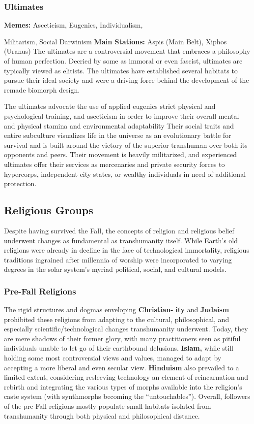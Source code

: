 \subsubsection{Ultimates}

\textbf{Memes:} Asceticism, Eugenics, Individualism, 

Militarism, Social Darwinism
\textbf{Main Stations:} Aspis (Main Belt), Xiphos (Uranus)
The ultimates are a controversial movement that 
embraces a philosophy of human perfection. Decried 
by some as immoral or even fascist, ultimates are typically
viewed as elitists. The ultimates have established
several habitats to pursue their ideal society and were 
a driving force behind the development of the remade 
biomorph design.

The ultimates advocate the use of applied eugenics
strict physical and psychological training, and
asceticism in order to improve their overall mental 
and physical stamina and environmental adaptability
Their social traits and entire subculture visualizes
life in the universe as an evolutionary battle
for survival and is built around the victory of the 
superior transhuman over both its opponents and 
peers. Their movement is heavily militarized, and 
experienced ultimates offer their services as mercenaries
and private security forces to hypercorps,
independent city states, or wealthy individuals in 
need of additional protection.

\subsection{Religious Groups}

Despite having survived the Fall, the concepts of 
religion and religious belief underwent changes as 
fundamental as transhumanity itself. While Earth's old 
religions were already in decline in the face of technological
immortality, religious traditions ingrained after
millennia of worship were incorporated to varying 
degrees in the solar system's myriad political, social, 
and cultural models.

\subsubsection{Pre-Fall Religions}

The rigid structures and dogmas enveloping \textbf{Christian-}
\textbf{ity} and \textbf{Judaism} prohibited these religions from adapting
to the cultural, philosophical, and especially scientific/technological
changes transhumanity underwent.
Today, they are mere shadows of their former glory, 
with many practitioners seen as pitiful individuals 
unable to let go of their earthbound delusions. \textbf{Islam,}
while still holding some most controversial views and 
values, managed to adapt by accepting a more liberal 
and even secular view. \textbf{Hinduism} also prevailed to a 
limited extent, considering resleeving technology an 
element of reincarnation and rebirth and integrating 
the various types of morphs available into the religion's
caste system (with synthmorphs becoming the
``untouchables''). Overall, followers of the pre-Fall 
religions mostly populate small habitats isolated from 
transhumanity through both physical and philosophical
distance.

